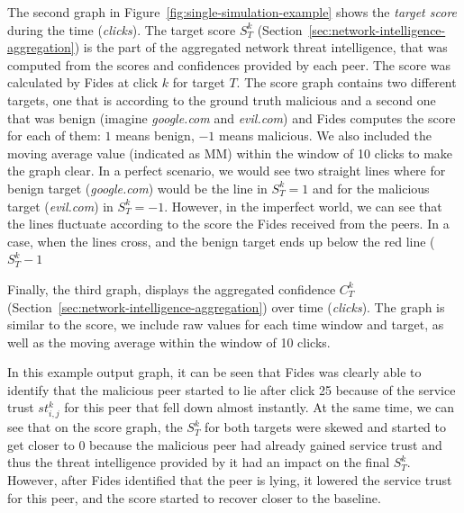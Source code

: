 The second graph in Figure~\ref{fig:single-simulation-example} shows the \textit{target score} during the time (\textit{clicks}).
The target score $S^{k}_{T}$ (Section~\ref{sec:network-intelligence-aggregation}) is the part of the aggregated network threat intelligence, that was computed from the scores and confidences provided by each peer. The score was calculated by Fides at click $k$ for target $T$.
The score graph contains two different targets, one that is according to the ground truth malicious and a second one that was benign (imagine \textit{google.com} and \textit{evil.com}) and Fides computes the score for each of them: $1$ means benign, $-1$ means malicious.
We also included the moving average value (indicated as MM) within the window of 10 clicks to make the graph clear.
In a perfect scenario, we would see two straight lines where for benign target (\textit{google.com}) would be the line in $S^{k}_{T} = 1$ and for the malicious target (\textit{evil.com}) in $S^{k}_{T} = -1$.
However, in the imperfect world, we can see that the lines fluctuate according to the score the Fides received from the peers.
In a case, when the lines cross, and the benign target ends up below the red line ($S^{k}_{T}  -1$

Finally, the third graph, displays the aggregated confidence $C^{k}_{T}$ (Section~\ref{sec:network-intelligence-aggregation}) over time (\textit{clicks}).
The graph is similar to the score, we include raw values for each time window and target, as well as the moving average within the window of 10 clicks.

In this example output graph, it can be seen that Fides was clearly able to identify that the malicious peer started to lie after click 25 because of the service trust $st^{k}_{i,j}$ for this peer that fell down almost instantly.
At the same time, we can see that on the score graph, the $S^{k}_{T}$ for both targets were skewed and started to get closer to $0$ because the malicious peer had already gained service trust and thus the threat intelligence provided by it had an impact on the final $S^{k}_{T}$.
However, after Fides identified that the peer is lying, it lowered the service trust for this peer, and the score started to recover closer to the baseline.